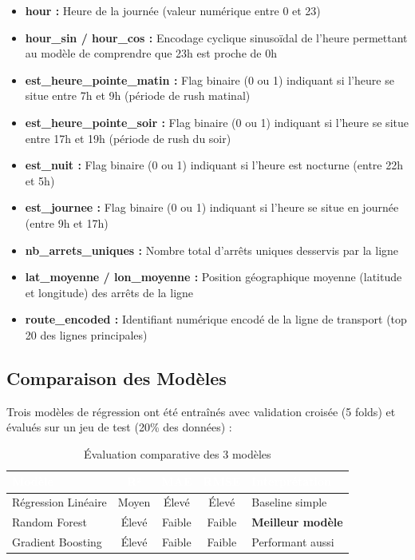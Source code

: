 \documentclass[12pt,a4paper]{article}
\begin{document}
\begin{itemize}[leftmargin=2cm]
    \item \textbf{hour :} Heure de la journée (valeur numérique entre 0 et 23)
    \item \textbf{hour\_sin / hour\_cos :} Encodage cyclique sinusoïdal de l'heure permettant au modèle de comprendre que 23h est proche de 0h
    \item \textbf{est\_heure\_pointe\_matin :} Flag binaire (0 ou 1) indiquant si l'heure se situe entre 7h et 9h (période de rush matinal)
    \item \textbf{est\_heure\_pointe\_soir :} Flag binaire (0 ou 1) indiquant si l'heure se situe entre 17h et 19h (période de rush du soir)
    \item \textbf{est\_nuit :} Flag binaire (0 ou 1) indiquant si l'heure est nocturne (entre 22h et 5h)
    \item \textbf{est\_journee :} Flag binaire (0 ou 1) indiquant si l'heure se situe en journée (entre 9h et 17h)
    \item \textbf{nb\_arrets\_uniques :} Nombre total d'arrêts uniques desservis par la ligne
    \item \textbf{lat\_moyenne / lon\_moyenne :} Position géographique moyenne (latitude et longitude) des arrêts de la ligne
    \item \textbf{route\_encoded :} Identifiant numérique encodé de la ligne de transport (top 20 des lignes principales)
\end{itemize}

\subsection{Comparaison des Modèles}

Trois modèles de régression ont été entraînés avec validation croisée (5 folds) et évalués sur un jeu de test (20\% des données) :

\begin{table}[H]
\centering
\begin{tabular}{|l|c|c|c|l|}
\hline
\rowcolor{bleuTBM} \textcolor{white}{\textbf{Modèle}} & \textcolor{white}{\textbf{R²}} & \textcolor{white}{\textbf{MAE}} & \textcolor{white}{\textbf{RMSE}} & \textcolor{white}{\textbf{Interprétation}} \\
\hline
Régression Linéaire & Moyen & Élevé & Élevé & Baseline simple \\
\hline
\rowcolor{grisClair} Random Forest & Élevé & Faible & Faible & \textbf{Meilleur modèle} \\
\hline
Gradient Boosting & Élevé & Faible & Faible & Performant aussi \\
\hline
\end{tabular}
\caption{Évaluation comparative des 3 modèles}
\end{table}
\end{document}
